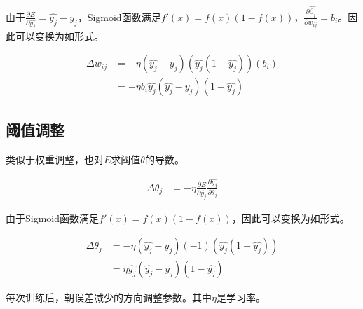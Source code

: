 由于$\frac{\partial E}{\partial \hat{y_j}} = \hat{y_j} - y_j$，Sigmoid函数满足$f\prime(x)=f(x)(1-f(x))$，$\frac{\partial \hat{\beta_j}}{\partial w_{ij}}=b_i$。因此可以变换为如形式。

\begin{equation}\label{eq:update-w-convert}
\begin{aligned}
\Delta w_{ij} &= -\eta (\hat{y_j} - y_j) (\hat{y_j}(1-\hat{y_j})) (b_i) \\
&= -\eta b_i \hat{y_j} (\hat{y_j} - y_j) (1 - \hat{y_j})
\end{aligned}
\end{equation}

\subsection{阈值调整}

类似于权重调整，也对$E$求阈值$\theta$的导数。

\begin{equation}\label{eq:update-theta}
\begin{aligned}
\Delta \theta_{j} &= -\eta \frac{\partial E}{\partial \hat{y_j}} \frac{\partial \hat{y_j}}{\partial \theta_j}
\end{aligned}
\end{equation}

由于Sigmoid函数满足$f\prime(x)=f(x)(1-f(x))$，因此可以变换为如形式。

\begin{equation}\label{eq:update-theta-convert}
\begin{aligned}
\Delta \theta_{j} &= -\eta (\hat{y_j} - y_j) (-1)(\hat{y_j}(1-\hat{y_j}))\\
&= \eta \hat{y_j} (\hat{y_j} - y_j) (1-\hat{y_j})
\end{aligned}
\end{equation}

每次训练后，朝误差减少的方向调整参数。其中$\eta$是学习率。